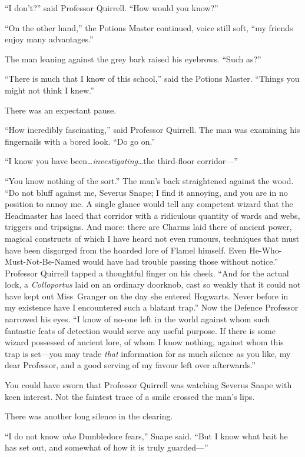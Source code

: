 “I don’t?” said Professor Quirrell. “How would you know?”

“On the other hand,” the Potions Master continued, voice still soft, “my friends enjoy many advantages.”

The man leaning against the grey bark raised his eyebrows. “Such as?”

“There is much that I know of this school,” said the Potions Master. “Things you might not think I knew.”

There was an expectant pause.

“How incredibly fascinating,” said Professor Quirrell. The man was examining his fingernails with a bored look. “Do go on.”

“I know you have been…\emph{investigating}…the third-floor corridor—”

“You know nothing of the sort.” The man’s back straightened against the wood. “Do not bluff against me, Severus Snape; I find it annoying, and you are in no position to annoy me. A single glance would tell any competent wizard that the Headmaster has laced that corridor with a ridiculous quantity of wards and webs, triggers and tripsigns. And more: there are Charms laid there of ancient power, magical constructs of which I have heard not even rumours, techniques that must have been disgorged from the hoarded lore of Flamel himself. Even He-Who-Must-Not-Be-Named would have had trouble passing those without notice.” Professor Quirrell tapped a thoughtful finger on his cheek. “And for the actual lock, a \emph{Colloportus} laid on an ordinary doorknob, cast so weakly that it could not have kept out Miss~Granger on the day she entered Hogwarts. Never before in my existence have I encountered such a blatant trap.” Now the Defence Professor narrowed his eyes. “I know of no-one left in the world against whom such fantastic feats of detection would serve any useful purpose. If there is some wizard possessed of ancient lore, of whom I know nothing, against whom this trap is set—you may trade \emph{that} information for as much silence as you like, my dear Professor, and a good serving of my favour left over afterwards.”

You could have sworn that Professor Quirrell was watching Severus Snape with keen interest. Not the faintest trace of a smile crossed the man’s lips.

There was another long silence in the clearing.

“I do not know \emph{who} Dumbledore fears,” Snape said. “But I know what bait he has set out, and somewhat of how it is truly guarded—”


